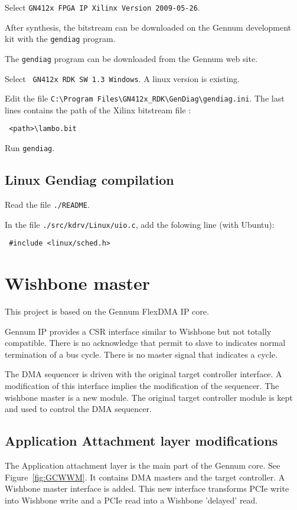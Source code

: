 \documentclass[10pt,a4paper]{cerndoc}
\begin{document}
Select \verb+GN412x FPGA IP Xilinx Version 2009-05-26+.

After synthesis, the bitstream can be downloaded on the Gennum development kit with the \verb+gendiag+ program.

The \verb+gendiag+ program can be downloaded from the Gennum web site. 

Select \verb+ GN412x RDK SW 1.3 Windows+. A linux version is existing.

Edit the file \verb+C:\Program Files\GN412x_RDK\GenDiag\gendiag.ini+. The last lines contains the path of the Xilinx bitstream file :
\begin{lstlisting}
 <path>\lambo.bit
\end{lstlisting}

Run \verb+gendiag+.

\subsection{Linux Gendiag compilation}
Read the file \verb+./README+.

In the file \verb+./src/kdrv/Linux/uio.c+, add the folowing line (with Ubuntu):
\begin{lstlisting}
 #include <linux/sched.h>
\end{lstlisting}


\section{Wishbone master}

This project is based on the Gennum FlexDMA IP core.

Gennum IP provides a CSR interface similar to Wishbone but not totally compatible. There is no acknowledge that permit to slave to indicates normal termination of a bus cycle. There is no master signal that indicates a cycle.

The DMA sequencer is driven with the original target controller interface. A modification of this interface implies the modification of the sequencer. The wishbone master is a new module. The original target controller module is kept and used to control the DMA sequencer.

  \subsection{Application Attachment layer modifications}
The Application attachment layer is the main part of the Gennum core. See Figure~\ref{fig:GCWWM}. It contains DMA masters and the target controller. A Wishbone master interface is added. This new interface transforms PCIe write into Wishbone write and a PCIe read into a Wishbone 'delayed' read. 
\end{document}
